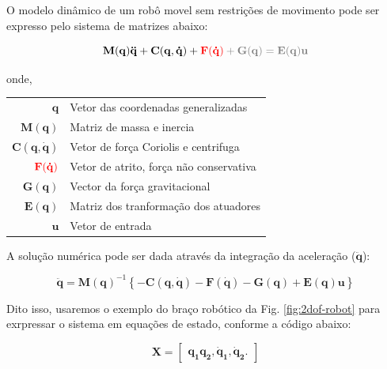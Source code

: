 O modelo dinâmico de um robô movel sem restrições de movimento pode ser expresso pelo sistema de matrizes abaixo:

\begin{equation}
    \mathbf{M(q)\ddot{q}+ C(q, \dot{q})+ \color{red}{F(\dot{q})}\color{gray}+G(q) = E(q)u}
\end{equation}

onde, 
\begin{tabular}{ r | l }
  $\mathbf{q}$               & Vetor das coordenadas generalizadas   \\
  $\mathbf{M(q)}$            & Matriz de massa e inercia             \\
  $\mathbf{C(q, \dot{q})}$   & Vetor de força Coriolis e centrifuga  \\
  $\color{red}{\mathbf{F(\dot{q})}}$      & Vetor de atrito, força não conservativa\footnotemark\\
  $\mathbf{G(q)}$            & Vector da força gravitacional         \\
  $\mathbf{E(q)}$            & Matriz dos tranformação dos atuadores \\
  $\mathbf{u}$               & Vetor de entrada                      \\
\end{tabular}


A solução numérica pode ser dada através da integração da aceleração ($\mathbf{\ddot{q}}$):

\begin{equation}
    \mathbf{\ddot{q}}=\mathbf{M(q)}^{-1}\left\{\mathbf{-C(q, \dot{q})-F(\dot{q})-G(q) + E(q)u}\right\}
\end{equation}

Dito isso, usaremos o exemplo do braço robótico da Fig. \ref{fig:2dof-robot} para exrpressar o sistema em equações de estado, conforme a código abaixo:

\begin{equation*}
    \mathbf{X} = 
    \begin{bmatrix}
        \mathbf{q_1 q_2, \dot{q}_1, \dot{q}_2}.  
    \end{bmatrix}
\end{equation*}

